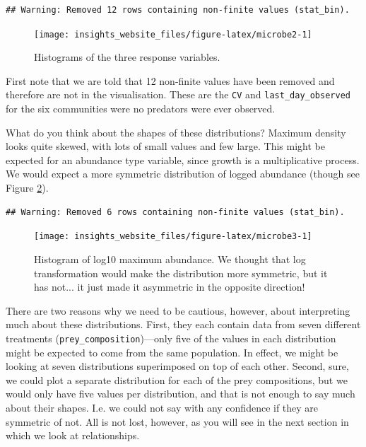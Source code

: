 \documentclass[]{book}
\begin{document}
\begin{verbatim}
## Warning: Removed 12 rows containing non-finite values (stat_bin).
\end{verbatim}

\begin{figure}

{\centering \texttt{[image: insights\_website\_files/figure-latex/microbe2-1]} 

}

\caption{Histograms of the three response variables.}\label{fig:microbe2}
\end{figure}

First note that we are told that 12 non-finite values have been removed and therefore are not in the visualisation. These are the \texttt{CV} and \texttt{last\_day\_observed} for the six communities were no predators were ever observed.

What do you think about the shapes of these distributions? Maximum density looks quite skewed, with lots of small values and few large. This might be expected for an abundance type variable, since growth is a multiplicative process. We would expect a more symmetric distribution of logged abundance (though see Figure \ref{fig:microbe3}).

\begin{verbatim}
## Warning: Removed 6 rows containing non-finite values (stat_bin).
\end{verbatim}

\begin{figure}

{\centering \texttt{[image: insights\_website\_files/figure-latex/microbe3-1]} 

}

\caption{Histogram of log10 maximum abundance. We thought that log transformation would make the distribution more symmetric, but it has not... it just made it asymmetric in the opposite direction!}\label{fig:microbe3}
\end{figure}

There are two reasons why we need to be cautious, however, about interpreting much about these distributions. First, they each contain data from seven different treatments (\texttt{prey\_composition})---only five of the values in each distribution might be expected to come from the same population. In effect, we might be looking at seven distributions superimposed on top of each other. Second, sure, we could plot a separate distribution for each of the prey compositions, but we would only have five values per distribution, and that is not enough to say much about their shapes. I.e. we could not say with any confidence if they are symmetric of not. All is not lost, however, as you will see in the next section in which we look at relationships.
\end{document}
